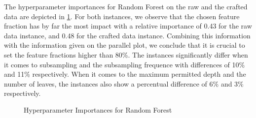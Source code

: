 The hyperparameter importances for Random Forest on the raw and the crafted data are depicted in \ref{fig:RF_Importances}. For both instances, we observe that the chosen feature fraction has by far the most impact with a relative importance of 0.43 for the raw data instance, and 0.48 for the crafted data instance. Combining this information with the information given on the parallel plot, we conclude that it is crucial to set the feature fractions higher than 80\%. The instances significantly differ when it comes to subsampling and the subsampling frequence with differences of 10\% and 11\% respectively. When it comes to the maximum permitted depth and the number of leaves, the instances also show a percentual difference of 6\% and 3\% respectively.
\begin{figure}[h]
	\centering
	\caption{Hyperparameter Importances for Random Forest}
	\label{fig:RF_Importances}
\end{figure} 
 
